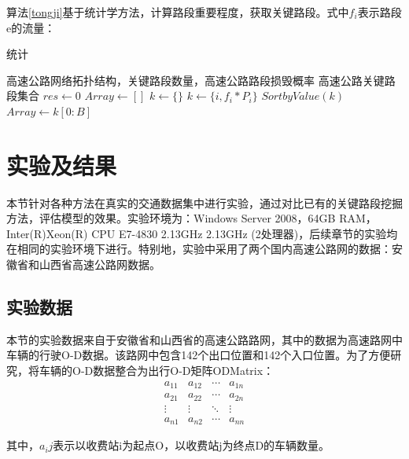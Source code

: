     	算法\ref{tongji}基于统计学方法，计算路段重要程度，获取关键路段。式中$f_i$表示路段e的流量：

    	\begin{algorithm}  
        \caption{统计}  
        \label{tongji}
        \begin{algorithmic}[1] %
            \Require 高速公路网络拓扑结构，关键路段数量，高速公路路段损毁概率
            \Ensure 高速公路关键路段集合
                \State $res\gets 0$  
                \State $Array\gets []$  
                \State $k\gets \{\}$ 
                	\State $k\gets \{i,f_i*P_i\}$
                \EndFor  
                \State $SortbyValue(k)$
                \State $Array\gets k[0:B]$
                \State {}  
            \EndFunction  
        \end{algorithmic}  
    	\end{algorithm} 

		\section{实验及结果}
		本节针对各种方法在真实的交通数据集中进行实验，通过对比已有的关键路段挖掘方法，评估模型的效果。实验环境为：Windows Server 2008，64GB RAM，Inter(R)Xeon(R) CPU E7-4830 2.13GHz 2.13GHz (2处理器)，后续章节的实验均在相同的实验环境下进行。特别地，实验中采用了两个国内高速公路网的数据：安徽省和山西省高速公路网数据。
			\subsection{实验数据}
				本节的实验数据来自于安徽省和山西省的高速公路路网，其中的数据为高速路网中车辆的行驶O-D数据。该路网中包含142个出口位置和142个入口位置。为了方便研究，将车辆的O-D数据整合为出行O-D矩阵ODMatrix：
				\[\begin{array}{*{20}{c}}
				{{a_{11}}}&{{a_{12}}}& \cdots &{{a_{1n}}}\\
				{{a_{21}}}&{{a_{22}}}& \cdots &{{a_{2n}}}\\
				 \vdots & \vdots & \ddots & \vdots \\
				{{a_{n1}}}&{{a_{n2}}}& \cdots &{{a_{nn}}}
				\end{array}\]

				其中，$a_ij$表示以收费站i为起点O，以收费站j为终点D的车辆数量。

